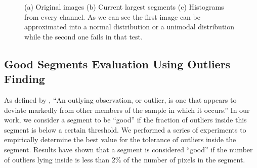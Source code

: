 \documentclass{llncs}
\begin{document}
\begin{figure}[!t]
\centering
{}
\caption{(a) Original images (b) Current largest segments (c) Histograms from every channel. As we can see the first image
can be approximated into a normal distribution or a unimodal distribution while the second one fails in that test.}
\label{fig:colorhists}
\end{figure}

\subsection{Good Segments Evaluation Using Outliers Finding}

As defined by \cite{grubbs-1969}, ``An outlying observation, or outlier, is one that appears to deviate markedly
from other members of the sample in which it occurs.'' In our work, we consider a segment to be ``good'' if the
fraction of outliers inside this segment is below a certain threshold.
We performed a series of experiments to empirically determine the best value for the tolerance of outliers
inside the segment. Results have shown that a segment is considered ``good'' if the number of outliers lying
inside is less than $2\%$ of the number of pixels in the segment.
\end{document}
